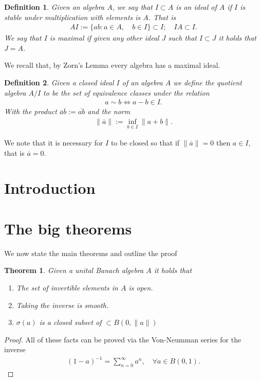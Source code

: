 \documentclass[12pt]{article}
\newtheorem{theorem}{Theorem}
\newtheorem{definition}{Definition}
\renewcommand{\norm}[1]{\lVert #1 \rVert}\renewcommand{\abs}[1]{\left| #1 \right|}
\begin{document}
\begin{CJK*}{UTF8}{gbsn}
	\begin{definition}
		Given an algebra $A$, we say that $I \subset A$ is an \emph{ideal}  of $A$ if $I$ is stable under multiplication with elements is  $A$. That is
		\begin{align*}
			AI := \{ a b: a\in A, \quad  b \in I \} \subset I; \quad IA \subset I .
		\end{align*}
		We say that $I$ is \emph{maximal }if given any other ideal  $J$ such that $I\subset J$ it holds that $J=A$.
	\end{definition}
	We recall that, by Zorn's Lemma every algebra has a maximal ideal.
	\begin{definition}
		Given a closed ideal $I $ of an algebra $A$ we define the quotient algebra  $A/I$ to be the set of equivalence classes under the relation
		\begin{align*}
			a \sim b \iff a-b \in I.
		\end{align*}
		With the product $\overline{a}\overline{b}:= \overline{ab}$ and the norm
		\begin{align*}
			\norm{\overline{a}}:= \inf_{ b \in  I } \norm{a+b}.
		\end{align*}
	\end{definition}
	We note that it is necessary for $I$ to be closed so that if $\norm{\overline{a}}=0$ then $a \in I$, that is $\overline{a}=0$.
	\section{Introduction}
	\section{The big theorems}
	We now state the main theorems and outline the proof
	\begin{theorem}
		Given a unital Banach algebra $A$ it holds that
		\begin{enumerate}
			\item The set of invertible elements in $A$ is open.
			\item Taking the inverse is smooth.
			\item $\sigma (a)$ is a closed subset of $\subset B(0,\norm{a})$
		\end{enumerate}
	\end{theorem}
	\begin{proof}
		All of these facts can be proved via the Von-Neumman series for the inverse
		\begin{align*}
			(1 -a)^{-1}=\sum_{n=0}^{\infty} a^n, \quad\forall a \in B(0,1) .
		\end{align*}
	\end{proof}



\end{CJK*}
\end{document}
